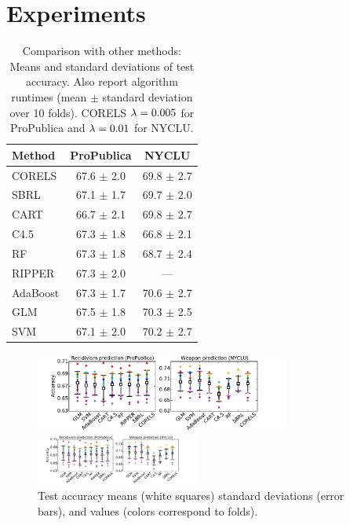\section{Experiments}
\label{sec:experiments}

\begin{arxiv}
\begin{table}[t!]
\centering
\begin{tabular}{l | c | c}
Method & ProPublica & NYCLU \\
\hline
CORELS & 67.6 $\pm$ 2.0 & 69.8 $\pm$ 2.7 \\
SBRL & 67.1 $\pm$ 1.7 & 69.7 $\pm$ 2.0 \\
CART & 66.7 $\pm$ 2.1 & 69.8 $\pm$ 2.7 \\
C4.5 & 67.3 $\pm$ 1.8 & 66.8 $\pm$ 2.1 \\
RF & 67.3 $\pm$ 1.8 & 68.7 $\pm$ 2.4 \\
RIPPER & 67.3 $\pm$ 2.0 & --- \\
AdaBoost & 67.3 $\pm$ 1.7 & 70.6 $\pm$ 2.7 \\
GLM & 67.5 $\pm$ 1.8 & 70.3 $\pm$ 2.5 \\
SVM & 67.1 $\pm$ 2.0 & 70.2 $\pm$ 2.7 \\
\end{tabular}
\vspace{5mm}
\caption{Comparison with other methods:
Means and standard deviations of test accuracy.
Also report algorithm runtimes (mean $\pm$ standard deviation over 10 folds).
CORELS ${{\lambda} = 0.005}$ for ProPublica and ${{\lambda} = 0.01}$ for NYCLU.}
\label{tab:comparison}
\end{table}
\end{arxiv}

\begin{figure}[t!]
\begin{center}
\begin{arxiv}
\includegraphics[width=0.75\textwidth]{figs/compare-compas-weapon.pdf}
\end{arxiv}
\begin{kdd}
\includegraphics[trim={10mm, 11mm, 25mm, 5mm},
width=0.48\textwidth]{figs/compare-compas-weapon.pdf}
\end{kdd}
\end{center}
\caption{Test accuracy means (white squares)
standard deviations (error bars),
and values (colors correspond to folds).
}
\label{fig:comparison}
\end{figure}

